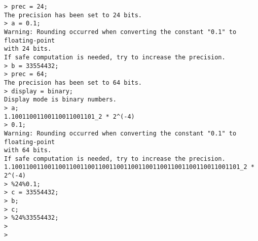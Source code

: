 \begin{center}\begin{minipage}{15cm}\begin{Verbatim}[frame=single]
> prec = 24;
The precision has been set to 24 bits.
> a = 0.1;
Warning: Rounding occurred when converting the constant "0.1" to floating-point 
with 24 bits.
If safe computation is needed, try to increase the precision.
> b = 33554432;
> prec = 64;
The precision has been set to 64 bits.
> display = binary;
Display mode is binary numbers.
> a;
1.10011001100110011001101_2 * 2^(-4)
> 0.1;
Warning: Rounding occurred when converting the constant "0.1" to floating-point 
with 64 bits.
If safe computation is needed, try to increase the precision.
1.100110011001100110011001100110011001100110011001100110011001101_2 * 2^(-4)
> %24%0.1;
> c = 33554432;
> b;
> c;
> %24%33554432;
> 
> 
\end{Verbatim}
\end{minipage}\end{center}
